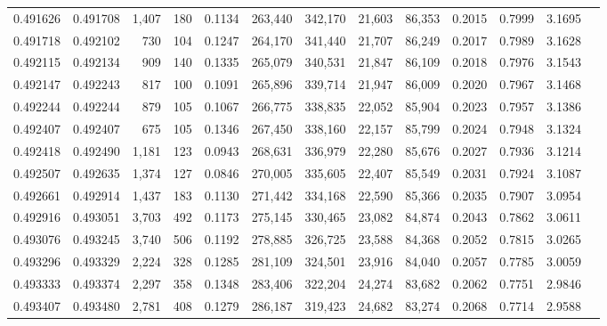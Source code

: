 \begin{tabular}{rrrrrrrrrrrrr}
0.491626 & 0.491708 & 1,407 &   180 &                                     0.1134 & 263,440 & 342,170 &  21,603 &  86,353 & 0.2015 & 0.7999 & 3.1695 \\
0.491718 & 0.492102 &   730 &   104 &                                     0.1247 & 264,170 & 341,440 &  21,707 &  86,249 & 0.2017 & 0.7989 & 3.1628 \\
0.492115 & 0.492134 &   909 &   140 &                                     0.1335 & 265,079 & 340,531 &  21,847 &  86,109 & 0.2018 & 0.7976 & 3.1543 \\
0.492147 & 0.492243 &   817 &   100 &                                     0.1091 & 265,896 & 339,714 &  21,947 &  86,009 & 0.2020 & 0.7967 & 3.1468 \\
0.492244 & 0.492244 &   879 &   105 &                                     0.1067 & 266,775 & 338,835 &  22,052 &  85,904 & 0.2023 & 0.7957 & 3.1386 \\
0.492407 & 0.492407 &   675 &   105 &                                     0.1346 & 267,450 & 338,160 &  22,157 &  85,799 & 0.2024 & 0.7948 & 3.1324 \\
0.492418 & 0.492490 & 1,181 &   123 &                                     0.0943 & 268,631 & 336,979 &  22,280 &  85,676 & 0.2027 & 0.7936 & 3.1214 \\
0.492507 & 0.492635 & 1,374 &   127 &                                     0.0846 & 270,005 & 335,605 &  22,407 &  85,549 & 0.2031 & 0.7924 & 3.1087 \\
0.492661 & 0.492914 & 1,437 &   183 &                                     0.1130 & 271,442 & 334,168 &  22,590 &  85,366 & 0.2035 & 0.7907 & 3.0954 \\
0.492916 & 0.493051 & 3,703 &   492 &                                     0.1173 & 275,145 & 330,465 &  23,082 &  84,874 & 0.2043 & 0.7862 & 3.0611 \\
0.493076 & 0.493245 & 3,740 &   506 &                                     0.1192 & 278,885 & 326,725 &  23,588 &  84,368 & 0.2052 & 0.7815 & 3.0265 \\
0.493296 & 0.493329 & 2,224 &   328 &                                     0.1285 & 281,109 & 324,501 &  23,916 &  84,040 & 0.2057 & 0.7785 & 3.0059 \\
0.493333 & 0.493374 & 2,297 &   358 &                                     0.1348 & 283,406 & 322,204 &  24,274 &  83,682 & 0.2062 & 0.7751 & 2.9846 \\
0.493407 & 0.493480 & 2,781 &   408 &                                     0.1279 & 286,187 & 319,423 &  24,682 &  83,274 & 0.2068 & 0.7714 & 2.9588 \\

\end{tabular}

